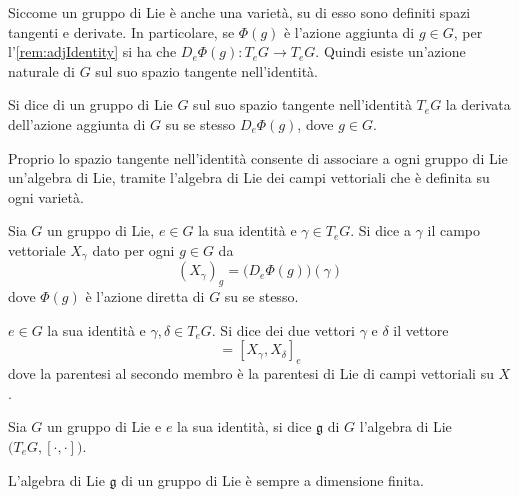 Siccome un gruppo di Lie è anche una varietà, su di esso sono definiti spazi tangenti e derivate. In particolare, se $\Phi(g)$ è l'azione aggiunta di $g \in G$, per l'\autoref{rem:adjIdentity} si ha che $D_e \Phi(g): T_e G \to T_e G$. Quindi esiste un'azione naturale di $G$ sul suo spazio tangente nell'identità.
\begin{definition}
  Si dice  di un gruppo di Lie $G$ sul suo spazio tangente nell'identità $T_e G$ la derivata dell'azione aggiunta di $G$ su se stesso $D_e \Phi(g)$, dove $g \in G$. 
\end{definition}

Proprio lo spazio tangente nell'identità consente di associare a ogni gruppo di Lie un'algebra di Lie, tramite l'algebra di Lie dei campi vettoriali che è definita su ogni varietà.
\begin{definition}
  Sia $G$ un gruppo di Lie, $e \in G$ la sua identità e $\gamma \in T_e G$. Si dice  a $\gamma$ il campo vettoriale $X_\gamma$ dato per ogni $g \in G$ da \begin{equation*}
  (X_\gamma)_g = \big(D_e \Phi(g)\big) (\gamma)
  \end{equation*} 
  dove $\Phi(g)$ è l'azione diretta di $G$ su se stesso.
\end{definition}
\begin{definition}
  $e \in G$ la sua identità e $\gamma, \delta \in T_e G$. Si dice  dei due vettori $\gamma$ e $\delta$ il vettore \begin{equation*}
  [\gamma,\delta] = [X_{\gamma}, X_{\delta}]_e
  \end{equation*} 
  dove la parentesi al secondo membro è la parentesi di Lie di campi vettoriali su $X$.
\end{definition}
\begin{definition}
  Sia $G$ un gruppo di Lie e $e$ la sua identità, si dice  $\mathfrak{g}$ di $G$ l'algebra di Lie $\big(T_e G, [\cdot ,\cdot ]\big)$.
\end{definition}
\begin{theorem}
  L'algebra di Lie $\mathfrak{g}$ di un gruppo di Lie è sempre a dimensione finita.
\end{theorem}

